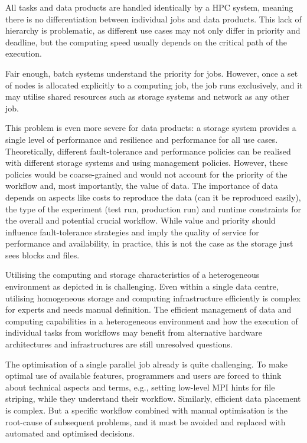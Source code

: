 \documentclass[a4paper]{article}
\begin{document}
{{\begin{description}
All tasks and data products are handled identically by a HPC system, meaning there is no differentiation between individual jobs and data products.
This lack of hierarchy is problematic, as different use cases may not only differ in priority and deadline, but the computing speed usually depends on the critical path of the execution.

Fair enough, batch systems understand the priority for jobs.
However, once a set of nodes is allocated explicitly to a computing job, the job runs exclusively, and it may utilise shared resources such as storage systems and network as any other job.

This problem is even more severe for data products: a storage system provides a single level of performance and resilience and performance for all use cases.
Theoretically, different fault-tolerance and performance policies can be realised with different storage systems and using management policies.
However, these policies would be coarse-grained and would not account for the priority of the workflow and, most importantly, the value of data.
The importance of data depends on aspects like costs to reproduce the data (can it be reproduced easily), the type of the experiment (test run, production run) and runtime constraints for the overall and potential crucial workflow.
While value and priority should influence fault-tolerance strategies and imply the quality of service for performance and availability, in practice, this is not the case as the storage just sees blocks and files.

\item[Manual Optimisation]

Utilising the computing and storage characteristics of a heterogeneous environment as depicted in  is challenging.
Even within a single data centre, utilising homogeneous storage and computing infrastructure efficiently is complex for experts and needs manual definition.
The efficient management of data and computing capabilities in a heterogeneous environment and
how the execution of individual tasks from workflows may benefit from alternative hardware architectures and infrastructures
are still unresolved questions.

The optimisation of a single parallel job already is quite challenging.
To make optimal use of available features, programmers and users are forced to think about technical aspects and terms, e.g., setting low-level MPI hints for file striping, while they understand their workflow.
Similarly, efficient data placement is complex. But a specific workflow combined with manual optimisation is the root-cause of subsequent problems, and it must be avoided and replaced with automated and optimised decisions.


\end{description}}}
\end{document}
